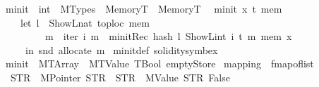 \begin{isabellebody}
\isanewline
{}\isamarkupfalse%
\ minit\ {\isacharcolon}{\kern0pt}{\isacharcolon}{\kern0pt}\ {\isachardoublequoteopen}int\ {\isasymRightarrow}\ MTypes\ {\isasymRightarrow}\ MemoryT\ {\isasymRightarrow}\ MemoryT{\isachardoublequoteclose}\isanewline
{}\isanewline
\ \ {\isachardoublequoteopen}minit\ x\ t\ mem\ {\isacharequal}{\kern0pt}\isanewline
\ \ \ \ {\isacharparenleft}{\kern0pt}let\ l\ {\isacharequal}{\kern0pt}\ ShowL\isactrlsub n\isactrlsub a\isactrlsub t\ {\isacharparenleft}{\kern0pt}toploc\ mem{\isacharparenright}{\kern0pt}{\isacharsemicolon}{\kern0pt}\isanewline
\ \ \ \ \ \ \ \ \ m\ {\isacharequal}{\kern0pt}\ iter\ {\isacharparenleft}{\kern0pt}{\isasymlambda}i\ m{\isacharprime}{\kern0pt}\ {\isachardot}{\kern0pt}\ minitRec\ {\isacharparenleft}{\kern0pt}hash\ l\ {\isacharparenleft}{\kern0pt}ShowL\isactrlsub i\isactrlsub n\isactrlsub t\ i{\isacharparenright}{\kern0pt}{\isacharparenright}{\kern0pt}\ t\ m{\isacharprime}{\kern0pt}{\isacharparenright}{\kern0pt}\ mem\ x\isanewline
\ \ \ \ \ in\ snd\ {\isacharparenleft}{\kern0pt}allocate\ m{\isacharparenright}{\kern0pt}{\isacharparenright}{\kern0pt}{\isachardoublequoteclose}\isanewline
\isanewline
{}\isamarkupfalse%
\ minit{\isacharunderscore}{\kern0pt}def\ {\isacharbrackleft}{\kern0pt}solidity{\isacharunderscore}{\kern0pt}symbex{\isacharbrackright}{\kern0pt}%
\isadelimdocument
%
\endisadelimdocument
%
\isatagdocument
%
\isamarkuptrue%
%
\endisatagdocument
{\isafolddocument}%
%
\isadelimdocument
%
\endisadelimdocument
{}\isamarkupfalse%
\ {\isachardoublequoteopen}minit\ {}\ {\isacharparenleft}{\kern0pt}MTArray\ {}\ {\isacharparenleft}{\kern0pt}MTValue\ TBool{\isacharparenright}{\kern0pt}{\isacharparenright}{\kern0pt}\ emptyStore\ {\isacharequal}{\kern0pt}\isanewline
{\isasymlparr}mapping\ {\isacharequal}{\kern0pt}\ fmap{\isacharunderscore}{\kern0pt}of{\isacharunderscore}{\kern0pt}list\isanewline
\ \ {\isacharbrackleft}{\kern0pt}{\isacharparenleft}{\kern0pt}STR\ {\isacharprime}{\kern0pt}{\isacharprime}{\kern0pt}{}{\isachardot}{\kern0pt}{}{\isacharprime}{\kern0pt}{\isacharprime}{\kern0pt}{\isacharcomma}{\kern0pt}\ MPointer\ STR\ {\isacharprime}{\kern0pt}{\isacharprime}{\kern0pt}{}{\isachardot}{\kern0pt}{}{\isacharprime}{\kern0pt}{\isacharprime}{\kern0pt}{\isacharparenright}{\kern0pt}{\isacharcomma}{\kern0pt}\ {\isacharparenleft}{\kern0pt}STR\ {\isacharprime}{\kern0pt}{\isacharprime}{\kern0pt}{}{\isachardot}{\kern0pt}{}{\isachardot}{\kern0pt}{}{\isacharprime}{\kern0pt}{\isacharprime}{\kern0pt}{\isacharcomma}{\kern0pt}\ MValue\ STR\ {\isacharprime}{\kern0pt}{\isacharprime}{\kern0pt}False{\isacharprime}{\kern0pt}{\isacharprime}{\kern0pt}{\isacharparenright}{\kern0pt}{\isacharcomma}{\kern0pt}\isanewline

\end{isabellebody}
